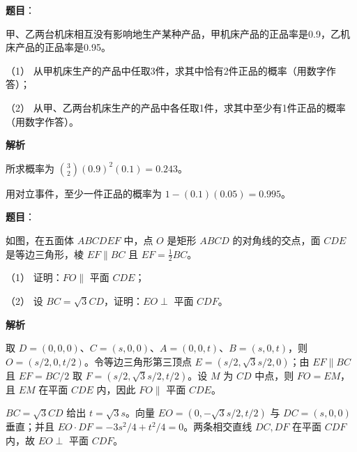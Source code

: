 \begin{answer}

\textbf{题目}：

甲、乙两台机床相互没有影响地生产某种产品，甲机床产品的正品率是0.9，乙机床产品的正品率是0.95。

（1） 从甲机床生产的产品中任取3件，求其中恰有2件正品的概率（用数字作答）；

（2） 从甲、乙两台机床生产的产品中各任取1件，求其中至少有1件正品的概率（用数字作答）。

\textbf{解析}


所求概率为 $\binom32(0.9)^2(0.1)=0.243$。


用对立事件，至少一件正品的概率为 $1-(0.1)(0.05)=0.995$。



\end{answer}
\begin{answer}

\textbf{题目}：

如图，在五面体 $ABCDEF$ 中，点 $O$ 是矩形 $ABCD$ 的对角线的交点，面 $CDE$ 是等边三角形，棱 $EF\parallel BC$ 且 $EF=\frac12BC$。

（1） 证明：$FO\parallel$ 平面 $CDE$；

（2） 设 $BC=\sqrt3CD$，证明：$EO\perp$ 平面 $CDF$。
\nopagebreak[4]
\begin{center}\end{center}
\nopagebreak[4]
\textbf{解析}


取 $D=(0,0,0)$、$C=(s,0,0)$、$A=(0,0,t)$、$B=(s,0,t)$，则 $O=(s/2,0,t/2)$。令等边三角形第三顶点 $E=(s/2,\sqrt3s/2,0)$；由 $EF\parallel BC$ 且 $EF=BC/2$ 取 $F=(s/2,\sqrt3s/2,t/2)$。设 $M$ 为 $CD$ 中点，则 $FO=EM$，且 $EM$ 在平面 $CDE$ 内，因此 $FO\parallel$ 平面 $CDE$。


$BC=\sqrt3CD$ 给出 $t=\sqrt3s$。向量 $EO=(0,-\sqrt3s/2,t/2)$ 与 $DC=(s,0,0)$ 垂直；并且 $EO\cdot DF=-3s^2/4+t^2/4=0$。两条相交直线 $DC,DF$ 在平面 $CDF$ 内，故 $EO\perp$ 平面 $CDF$。



\end{answer}
